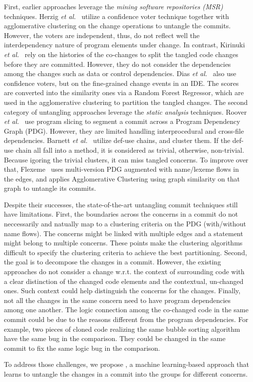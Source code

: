 First, earlier approaches leverage the {\em mining software
  repositories (MSR)} techniques. Herzig {\em et
  al.}~\cite{kim-msr13,kim-emse16} utilize a confidence voter
technique together with agglomerative clustering on the change
operations to untangle the commits.
However, the voters are independent, thus, do not reflect well the
interdependency nature of program elements under change. In contrast,
Kirinuki {\em et al.}~\cite{higo-apsec16, higo-icpc14} rely on the
histories of the co-changes to split the tangled code changes before
they are committed. However, they do not consider the dependencies
among the changes such as data or control dependencies. Dias {\em et
  al.}~\cite{dias-saner15} also use confidence voters, but on the
fine-grained change events in an IDE. The scores are converted into
the similarity ones via a Random Forest Regressor, which are used in
the agglomerative clustering to partition the tangled changes.  The
second category of untangling approaches leverage the {\em static
  analysis} techniques. Roover {\em et al.}~\cite{roover-scam18} use
program slicing to segment a commit across a Program Dependency Graph
(PDG).  However, they are limited handling interprocedural and
cross-file dependencies. Barnett {\em et al.}~\cite{barnett-icse15}
utilize def-use chains, and cluster them. If the def-use chain all
fall into a method, it is considered as trivial, otherwise,
non-trivial. Because igoring the trivial clusters, it can miss tangled
concerns. To improve over that, Flexeme~\cite{flexeme-fse20} uses
multi-version PDG augmented with name/lexeme flows in the edges, and
applies Agglomerative Clustering using graph similarity on that graph
to untangle its commits.

Despite their successes, the state-of-the-art untangling commit
techniques still have limitations. First, the boundaries across the
concerns in a commit do not neccessarily and natually map to a
clustering criteria on the PDG (with/without name flows).  The
concerns might be linked with multiple edges and a statement might
belong to multiple concerns. These points make the clustering
algorithms difficult to specify the clustering criteria to achieve the
best partitioning. Second, the goal is to decompose the changes in a
commit. However, the existing approaches do not consider a change
w.r.t. the context of surrounding code with a clear distinction of the
changed code elements and the contextual, un-changed ones. Such
context could help distinguish the concerns for the changes. Finally,
not all the changes in the same concern need to have program
dependencies among one another. The logic connection among the
co-changed code in the same commit could be due to the reasons
different from the program dependencies. For example, two pieces of
cloned code realizing the same bubble sorting algorithm have the same
bug in the comparison. They could be changed in the same commit to fix
the same logic bug in the comparison.

To address those challenges, we propose {\tool}, a machine
learning-based approach that learns to untangle the changes in a
commit into the groups for different concerns.
